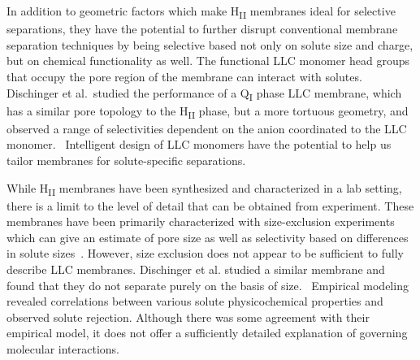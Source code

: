 \documentclass[journal=jpcbfk,manuscript=article]{achemso}
\begin{document}
  In addition to geometric factors which make H\textsubscript{II} membranes
  ideal for selective separations, they have the potential to further disrupt
  conventional membrane separation techniques by being selective based not
  only on solute size and charge, but on chemical functionality as well. 
  The functional LLC monomer head groups that occupy the pore region of the
  membrane can interact with solutes. Dischinger et al.~studied the 
  performance of a Q\textsubscript{I} phase LLC membrane, which has a 
  similar pore topology to the H\textsubscript{II} phase, but a more 
  tortuous geometry, and observed a range of selectivities dependent on the
  anion coordinated to the LLC monomer.~\cite{dischinger_effect_2017} Intelligent 
  design of LLC monomers have the potential to help us tailor membranes for 
  solute-specific separations.

  While H\textsubscript{II} membranes have been synthesized and characterized
  in a lab setting, there is a limit to the level of detail that can be obtained 
  from experiment. These membranes have been primarily characterized with 
  size-exclusion experiments which can give an estimate of pore size as well as
  selectivity based on differences in solute sizes~\cite{zhou_supported_2005}. 
  However, size exclusion does not appear to be sufficient to fully describe LLC
  membranes. Dischinger et al. studied a similar membrane and found that they do
  not separate purely on the basis of size.~\cite{dischinger_effect_2017} Empirical modeling revealed correlations
  between various solute physicochemical properties and observed solute rejection. 
  Although there was some agreement with their empirical model, it does not
  offer a sufficiently detailed explanation of governing molecular interactions.~\cite{dischinger_effect_2017}
 
\end{document}
